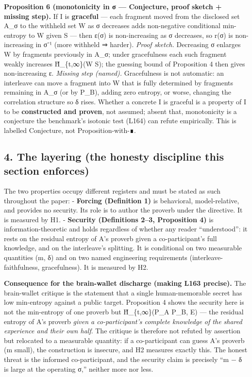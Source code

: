 \documentclass[
  11pt,
]{article}
\begin{document}
\textbf{Proposition 6 (monotonicity in σ --- Conjecture, proof sketch +
missing step).} If I is \textbf{graceful} --- each fragment moved from
the disclosed set A\_σ to the withheld set W as σ decreases adds
non-negative conditional min-entropy to W given S --- then ε(σ) is
non-increasing as σ decreases, so r(σ) is non-increasing in σ⁻¹ (more
withheld ⇒ harder). \emph{Proof sketch.} Decreasing σ enlarges W by
fragments previously in A\_σ; under gracefulness each such fragment
weakly increases H̃\_\{t,∞\}(W \textbar{} S); the guessing bound of
Proposition 4 then gives non-increasing ε. \emph{Missing step (named).}
Gracefulness is not automatic: an interleave can move a fragment into W
that is fully determined by fragments remaining in A\_σ (or by P\_B),
adding zero entropy, or worse, changing the correlation structure so δ
rises. Whether a concrete I is graceful is a property of I to be
\textbf{constructed and proven}, not assumed; absent that, monotonicity
is a conjecture the benchmark's isotonic test (L164) can refute
empirically. This is labelled Conjecture, not Proposition-with-∎.

\subsection{4. The layering (the honesty discipline this section
enforces)}\label{the-layering-the-honesty-discipline-this-section-enforces}

The two properties occupy different registers and must be stated as such
throughout the paper: - \textbf{Forcing (Definition 1)} is behavioral,
model-relative, and provides no security. Its role is to author the
proverb under the directive. It is measured by H1. - \textbf{Security
(Definitions 2--3, Proposition 4)} is information-theoretic and holds
regardless of whether any reader ``understood'': it rests on the
residual entropy of A's proverb given a co-participant's full knowledge,
and on the interleave's splitting. It is conditional on two measurable
quantities (m, δ) and on two named engineering requirements
(interleave-faithfulness, gracefulness). It is measured by H2.

\textbf{Consequence for the brain-wallet discharge (making L163
precise).} The brain-wallet critique is the statement that a single
human-memorable secret has low min-entropy against a public target.
Proposition 4 shows the security here is not the min-entropy of one
proverb but H̃\_\{t,∞\}(P\_A \textbar{} P\_B, E) --- the residual entropy
of A's proverb \emph{given a co-participant's complete knowledge of the
shared experience and their own half}. The critique is therefore not
refuted by assertion but relocated to a measurable quantity: if a
co-participant can guess A's proverb (m small), the construction is
insecure, and H2 measures exactly this. The honest threat is the
informed co-participant, and the security claim is precisely ``m − δ is
large at the operating σ,'' neither more nor less.
\end{document}
